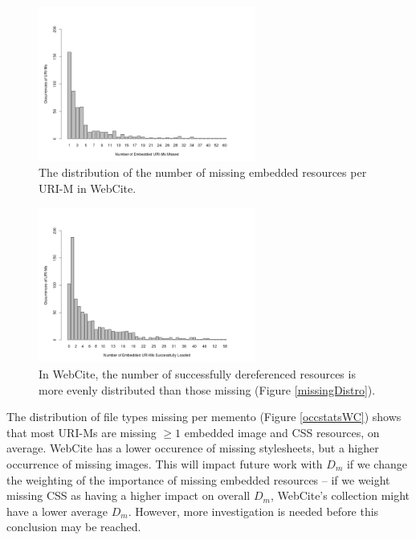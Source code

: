 \begin{figure}[h!]
\includegraphics[width=270px]{./imgs/OccStats_webcite.png}
\caption{The distribution of the number of missing embedded resources per URI-M in WebCite.}
\label{missingDistroWC}
\end{figure}


\begin{figure}[h!]
\includegraphics[width=270px]{./imgs/OccStatsFound_webcite.png}
\caption{In WebCite, the number of successfully dereferenced resources is more evenly distributed than those missing (Figure \ref{missingDistro}).}
\label{foundDistroWC}
\end{figure}



The distribution of file types missing per memento (Figure \ref{occstatsWC}) shows that most URI-Ms are missing $\ge 1$ embedded image and CSS resources, on average. WebCite has a lower occurence of missing stylesheets, but a higher occurrence of missing images. This will impact future work with $D_m$ if we change the weighting of the importance of missing embedded resources -- if we weight missing CSS as having a higher impact on overall $D_m$, WebCite's collection might have a lower average $D_m$. However, more investigation is needed before this conclusion may be reached. 

